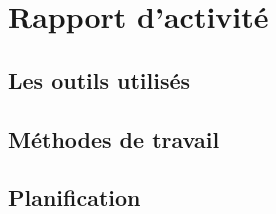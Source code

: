 \chapter{Rapport d'activité}

\section{Les outils utilisés}






\section{Méthodes de travail}






\section{Planification}